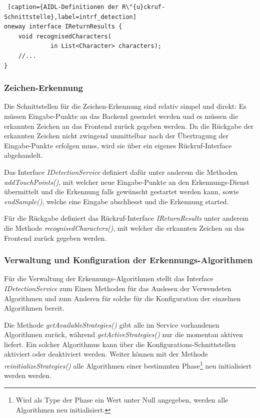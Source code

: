 \begin{lstlisting} [caption={AIDL-Definitionen der R\"{u}ckruf-Schnittstelle},label=intrf_detection]
oneway interface IReturnResults {
    void recognisedCharacters(
             in List<Character> characters);
    //...
}
\end{lstlisting}

\subsubsection{Zeichen-Erkennung}

Die Schnittstellen für die Zeichen-Erkennung sind relativ simpel und direkt: Es müssen Eingabe-Punkte an das Backend gesendet werden und es müssen die erkannten Zeichen an das Frontend zurück gegeben werden. Da die Rückgabe der erkannten Zeichen nicht zwingend unmittelbar nach der Übertragung der Eingabe-Punkte erfolgen muss, wird sie über ein eigenes Rückruf-Interface abgehandelt.

Das Interface \emph{IDetectionService} definiert dafür unter anderem die Methoden \emph{addTouchPoints()}, mit welcher neue Eingabe-Punkte an den Erkennungs-Dienst übermittelt und die Erkennung falls gewünscht gestartet werden kann, sowie \emph{endSample()}, welche eine Eingabe abschliesst und die Erkennung started.

Für die Rückgabe definiert das Rückruf-Interface \emph{IReturnResults} unter anderem die Methode \emph{recognisedCharacters()}, mit welcher die erkannten Zeichen an das Frontend zurück gegeben werden.

\subsubsection{Verwaltung und Konfiguration der Erkennungs-Algorithmen}

Für die Verwaltung der Erkennungs-Algorithmen stellt das Interface \emph{IDetectionService} zum Einen Methoden für das Auslesen der Verwendeten Algorithmen und zum Anderen für solche für die Konfiguration der einzelnen Algorithmen bereit.

Die Methode \emph{getAvailableStrategies()} gibt alle im Service vorhandenen Algorithmen zurück, während \emph{getActiveStrategies()} nur die momentan aktiven liefert. Ein solcher Algorithmus kann über die Konfigurations-Schnittstellen aktiviert oder deaktiviert werden. Weiter können mit der Methode \emph{reinitializeStrategies()} alle Algorithmen einer bestimmten Phase\footnote{Wird als Type der Phase ein Wert unter Null angegeben, werden alle Algorithmen neu initialisiert.} neu initialisiert werden werden.


